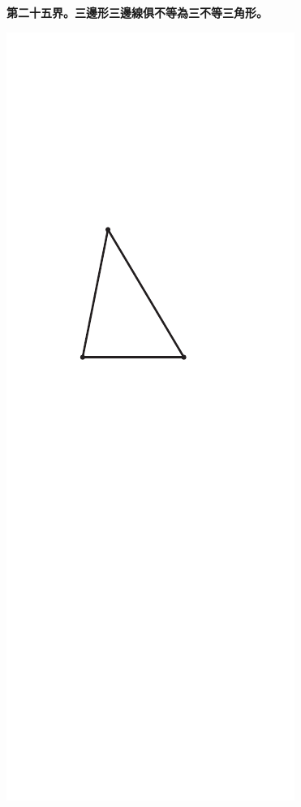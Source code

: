 \documentclass[12pt,b5paper,landscape]{article}
\newcommand{\cthm}[1]{{
\vspace{8pt}

\bfseries #1}}
\begin{document}
\begin{multicols}{2}
\cthm{第二十五界。三邊形三邊線俱不等為三不等三角形。}
\begin{center}
\includegraphics[angle=90]{eu16}
\end{center}


\end{multicols}
\end{document}
